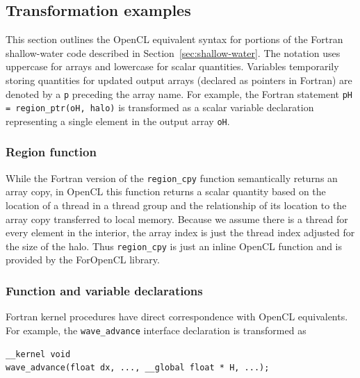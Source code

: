 

\subsection{Transformation examples}

This section outlines the OpenCL equivalent syntax for portions of the Fortran
shallow-water code described in Section~\ref{sec:shallow-water}.  The notation
uses uppercase for arrays and lowercase for scalar quantities.  Variables
temporarily storing quantities for updated output arrays (declared as pointers
in Fortran) are denoted by a {\tt p} preceding the array name.  For example, the
Fortran statement {\tt pH = region\_ptr(oH, halo)} is transformed as a scalar
variable declaration representing a single element in the output array {\tt oH}.

\subsubsection{Region function}

While the Fortran version of the {\tt region\_cpy} function semantically returns
an array copy, in OpenCL this function returns a scalar quantity based on the
location of a thread in a thread group and the relationship of its location to
the array copy transferred to local memory.  Because we assume there is a thread
for every element in the interior, the array index is just the thread index
adjusted for the size of the halo.  Thus {\tt region\_cpy} is just an inline
OpenCL function and is provided by the ForOpenCL library.

\subsubsection{Function and variable declarations}

Fortran kernel procedures have direct correspondence with OpenCL equivalents.
For example, the {\tt wave\_advance} interface declaration is transformed as

{\small
\begin{verbatim}
__kernel void
wave_advance(float dx, ..., __global float * H, ...);
\end{verbatim}
}

